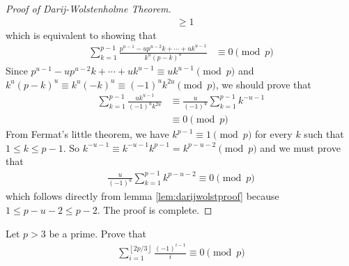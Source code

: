 \documentclass{subfile}
\begin{document}
\begin{proof}[Proof of Darij-Wolstenholme Theorem]
\begin{align*}
				& \geq 1
		\end{align*}
		which is equivalent to showing that
		\begin{align*}
			\sum_{k = 1}^{p - 1}\frac {p^{u - 1} - up^{u - 2}k+\cdots + uk^{u - 1}}{k^{u}\left(p - k\right)^{u}}
				& \equiv 0 \pmod p
		\end{align*}
		Since $p^{u - 1} - up^{u - 2}k+\cdots + uk^{u - 1} \equiv uk^{u - 1} \pmod p$ and $k^{u}\left(p - k\right)^{u} \equiv k^{u}\left( - k\right)^{u} \equiv (-1)^u k^{2u} \pmod p$, we should prove that
			\begin{align*}
				\sum_{k = 1}^{p - 1}\frac {uk^{u - 1}}{\left( - 1\right)^{u}k^{2u}}
					& \equiv\frac {u}{\left( - 1\right)^{u}}\sum_{k = 1}^{p - 1}k^{ - u - 1}\\
					& \equiv 0 \pmod p
			\end{align*}
		From Fermat's little theorem, we have $k^{p-1} \equiv 1 \pmod p$ for every $k$ such that $1 \leq k \leq p-1$. So $ k^{ - u - 1}\equiv k^{ - u - 1}k^{p - 1} = k^{p - u - 2}\pmod p$ and we must prove that
		\begin{align*}
		\frac {u}{\left( - 1\right)^{u}}\sum_{k = 1}^{p - 1}k^{p - u - 2}\equiv 0 \pmod p
		\end{align*}
		which follows directly from lemma \eqref{lem:darijwolstproof} because $ 1\leq p - u - 2\leq p - 2$. The proof is complete.
	\end{proof}

	\begin{problem}
		Let $p>3$ be a prime. Prove that
		\begin{align*}
		\sum_{i = 1}^{\left\lfloor 2p/3\right\rfloor}\frac {\left( - 1\right)^{i - 1}}{i} \equiv 0 \pmod p
		\end{align*}
	\end{problem}
\end{document}
